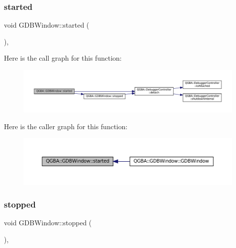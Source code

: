 \subsubsection{\texorpdfstring{started}{started}}
{\footnotesize\ttfamily void G\+D\+B\+Window\+::started (\begin{DoxyParamCaption}{ }\end{DoxyParamCaption})\hspace{0.3cm}{\ttfamily [private]}, {\ttfamily [slot]}}

Here is the call graph for this function\+:
\nopagebreak
\begin{figure}[H]
\begin{center}
\leavevmode
\includegraphics[width=350pt]{class_q_g_b_a_1_1_g_d_b_window_ae3a866cf6616fbf6a7012ac5e8a8abd3_cgraph}
\end{center}
\end{figure}
Here is the caller graph for this function\+:
\nopagebreak
\begin{figure}[H]
\begin{center}
\leavevmode
\includegraphics[width=350pt]{class_q_g_b_a_1_1_g_d_b_window_ae3a866cf6616fbf6a7012ac5e8a8abd3_icgraph}
\end{center}
\end{figure}
\mbox{\label{class_q_g_b_a_1_1_g_d_b_window_a7bd93507046abbd87f237a6065a3cd21}} 
\subsubsection{\texorpdfstring{stopped}{stopped}}
{\footnotesize\ttfamily void G\+D\+B\+Window\+::stopped (\begin{DoxyParamCaption}{ }\end{DoxyParamCaption})\hspace{0.3cm}{\ttfamily [private]}, {\ttfamily [slot]}}

